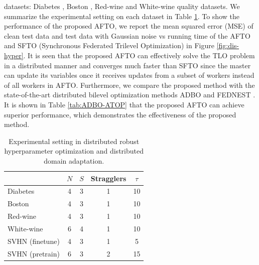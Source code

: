 \documentclass[letterpaper]{article} %
\begin{document}
datasets: Diabetes  \cite{dua2017uci}, Boston  \cite{harrison1978hedonic}, Red-wine and White-wine quality  \cite{cortez2009modeling} datasets. We summarize the experimental setting on each dataset in Table \ref{tab:details_main}. To show the performance of the proposed AFTO, we report the mean squared error (MSE) of clean test data and test data with Gaussian noise vs running time of the AFTO and SFTO (Synchronous Federated Trilevel Optimization) in Figure \ref{fig:dis-hyper}. It is seen that the proposed AFTO can effectively solve the TLO problem in a distributed manner and converges much faster than SFTO since the master can update its variables once it receives updates from a subset of workers instead of all workers in AFTO. Furthermore, we compare the proposed method with the state-of-the-art distributed bilevel optimization methods ADBO \cite{jiao2022asynchronous} and FEDNEST \cite{tarzanagh2022fednest}. It is shown in Table \ref{tab:ADBO-ATOP} that the proposed AFTO can achieve superior performance, which demonstrates the effectiveness of the proposed method.


\renewcommand\arraystretch{1.1}
\renewcommand\tabcolsep{10pt}
\begin{table}[t]
\centering
\renewcommand{\thetable}{\arabic{table}}
{
\begin{tabular}{l|c|c|c|c}
\toprule
    & $N$     & $S$ & Stragglers & $\tau$ \\ \hline
Diabetes  & 4  & 3 & 1 & 10 \\
Boston & 4  & 3 & 1  & 10 \\
Red-wine & 4  & 3 & 1 & 10\\
White-wine & 6  & 4 &  1 & 10 \\
SVHN (finetune) & 4  & 3 & 1  & 5 \\
SVHN (pretrain) & 6  & 3 & 2  & 15\\
\bottomrule
\end{tabular}}
\caption{Experimental setting in distributed robust hyperparameter optimization and distributed
domain adaptation.}
\label{tab:details_main}
\end{table}
\end{document}
